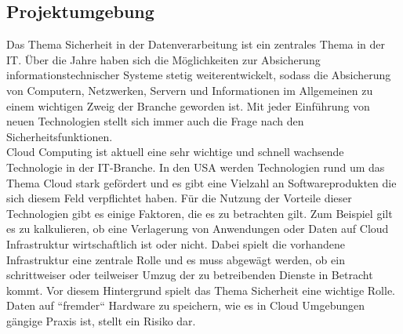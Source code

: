 \documentclass[
book,
a4paper,   
titlepage,  
halfparskip,
12pt        
]{scrartcl}
\begin{document}
\begin{onehalfspacing}
\subsection{Projektumgebung}
\label{subsec:proj}
Das Thema Sicherheit in der Datenverarbeitung ist ein zentrales Thema in der \ac{IT}. Über die Jahre haben sich die Möglichkeiten zur Absicherung informationstechnischer Systeme stetig weiterentwickelt, sodass die Absicherung von Computern, Netzwerken, Servern und Informationen im Allgemeinen zu einem wichtigen Zweig der Branche geworden ist. Mit jeder Einführung von neuen Technologien stellt sich immer auch die Frage nach den Sicherheitsfunktionen.\\
Cloud Computing ist aktuell eine sehr wichtige und schnell wachsende Technologie in der \ac{IT}-Branche. In den \ac{USA} werden Technologien rund um das Thema Cloud stark gefördert und es gibt eine Vielzahl an Softwareprodukten die sich diesem Feld verpflichtet haben. Für die Nutzung der Vorteile dieser Technologien gibt es einige Faktoren, die es zu betrachten gilt. Zum Beispiel gilt es zu kalkulieren, ob eine Verlagerung von Anwendungen oder Daten auf Cloud Infrastruktur wirtschaftlich ist oder nicht. Dabei spielt die vorhandene Infrastruktur eine zentrale Rolle und es muss abgewägt werden, ob ein schrittweiser oder teilweiser Umzug der zu betreibenden Dienste in Betracht kommt. Vor diesem Hintergrund spielt das Thema Sicherheit eine wichtige Rolle. Daten auf ``fremder`` Hardware zu speichern, wie es in Cloud Umgebungen gängige Praxis ist, stellt ein Risiko dar.


\end{onehalfspacing}
\end{document}
